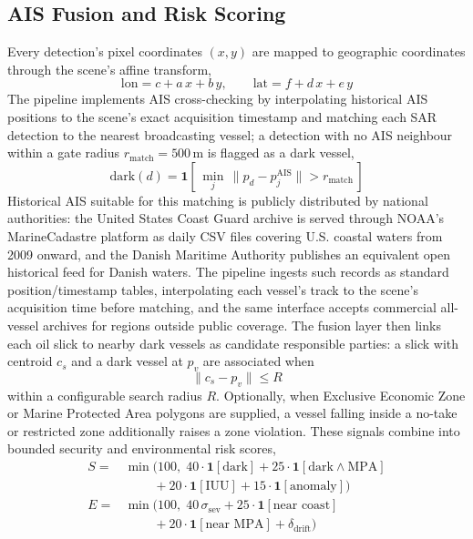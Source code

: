 \documentclass{ieeeaccess}
\begin{document}
\subsection{AIS Fusion and Risk Scoring}
\label{subsec:fusion}

Every detection's pixel coordinates $(x,y)$ are mapped to geographic coordinates through the scene's affine transform,
\begin{equation}
\text{lon} = c + a\,x + b\,y, \qquad \text{lat} = f + d\,x + e\,y
\label{eq:affine}
\end{equation}
The pipeline implements AIS cross-checking by interpolating historical AIS positions to the scene's exact acquisition timestamp and matching each SAR detection to the nearest broadcasting vessel; a detection with no AIS neighbour within a gate radius $r_{\text{match}}=500$\,m is flagged as a dark vessel,
\begin{equation}
\text{dark}(d) = \mathbf{1}\!\left[\,\min_{j}\,\lVert p_d - p^{\text{AIS}}_j\rVert > r_{\text{match}}\,\right]
\label{eq:dark}
\end{equation}
Historical AIS suitable for this matching is publicly distributed by national authorities: the United States Coast Guard archive is served through NOAA's MarineCadastre platform as daily CSV files covering U.S. coastal waters from 2009 onward, and the Danish Maritime Authority publishes an equivalent open historical feed for Danish waters. The pipeline ingests such records as standard position/timestamp tables, interpolating each vessel's track to the scene's acquisition time before matching, and the same interface accepts commercial all-vessel archives for regions outside public coverage. The fusion layer then links each oil slick to nearby dark vessels as candidate responsible parties: a slick with centroid $c_s$ and a dark vessel at $p_v$ are associated when
\begin{equation}
\lVert c_s - p_v \rVert \le R
\label{eq:fuse}
\end{equation}
within a configurable search radius $R$. Optionally, when Exclusive Economic Zone or Marine Protected Area polygons are supplied, a vessel falling inside a no-take or restricted zone additionally raises a zone violation. These signals combine into bounded security and environmental risk scores,
\begin{align}
S ={}& \min\!\big(100,\; 40\cdot\mathbf{1}[\text{dark}] + 25\cdot\mathbf{1}[\text{dark}\wedge\text{MPA}] \nonumber\\
     & \qquad\; + 20\cdot\mathbf{1}[\text{IUU}] + 15\cdot\mathbf{1}[\text{anomaly}]\big)
\label{eq:secrisk}\\
E ={}& \min\!\big(100,\; 40\,\sigma_{\text{sev}} + 25\cdot\mathbf{1}[\text{near coast}] \nonumber\\
     & \qquad\; + 20\cdot\mathbf{1}[\text{near MPA}] + \delta_{\text{drift}}\big)
\label{eq:envrisk}
\end{align}
\end{document}
